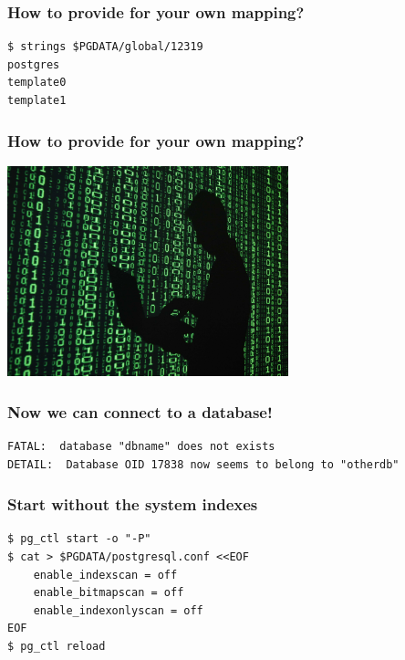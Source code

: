 \documentclass{beamer}
\begin{document}
\begin{frame}[fragile]
  \frametitle{How to provide for your own mapping?}

  \begin{verbatim}
$ strings $PGDATA/global/12319
postgres
template0
template1
  \end{verbatim}  
\end{frame}

\begin{frame}
  \frametitle{How to provide for your own mapping?}
  
  \vfill
  
  \begin{center}
    \includegraphics[height=2.4in]{Hacker-2.jpg}
  \end{center}
\end{frame}

\begin{frame}[fragile]
  \frametitle{Now we can connect to a database!}
  
  \vfill

  \begin{verbatim}
FATAL:  database "dbname" does not exists
DETAIL:  Database OID 17838 now seems to belong to "otherdb"
  \end{verbatim}  
\end{frame}

\begin{frame}[fragile]
  \frametitle{Start without the system indexes}
  
  \vfill

  \begin{verbatim}
$ pg_ctl start -o "-P"
$ cat > $PGDATA/postgresql.conf <<EOF
	enable_indexscan = off
	enable_bitmapscan = off
	enable_indexonlyscan = off
EOF
$ pg_ctl reload
  \end{verbatim}  
\end{frame}
\end{document}
